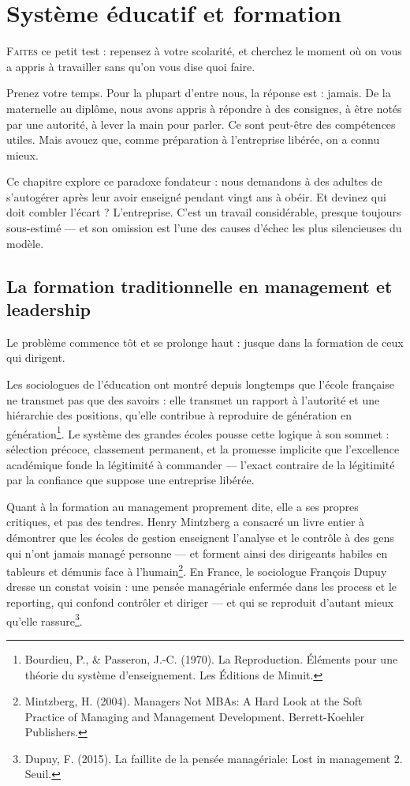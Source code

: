 
\chapter{Système éducatif et formation}

\lettrine[lines=2]{F}{aites} ce petit test : repensez à votre scolarité, et cherchez le moment où on vous a appris à travailler sans qu'on vous dise quoi faire.

Prenez votre temps. Pour la plupart d'entre nous, la réponse est : jamais. De la maternelle au diplôme, nous avons appris à répondre à des consignes, à être notés par une autorité, à lever la main pour parler. Ce sont peut-être des compétences utiles. Mais avouez que, comme préparation à l'entreprise libérée, on a connu mieux.

Ce chapitre explore ce paradoxe fondateur : nous demandons à des adultes de s'autogérer après leur avoir enseigné pendant vingt ans à obéir. Et devinez qui doit combler l'écart ? L'entreprise. C'est un travail considérable, presque toujours sous-estimé — et son omission est l'une des causes d'échec les plus silencieuses du modèle.

\section{La formation traditionnelle en management et leadership}

Le problème commence tôt et se prolonge haut : jusque dans la formation de ceux qui dirigent.

Les sociologues de l'éducation ont montré depuis longtemps que l'école française ne transmet pas que des savoirs : elle transmet un rapport à l'autorité et une hiérarchie des positions, qu'elle contribue à reproduire de génération en génération\footnote{Bourdieu, P., \& Passeron, J.-C. (1970). La Reproduction. Éléments pour une théorie du système d'enseignement. Les Éditions de Minuit.}. Le système des grandes écoles pousse cette logique à son sommet : sélection précoce, classement permanent, et la promesse implicite que l'excellence académique fonde la légitimité à commander — l'exact contraire de la légitimité par la confiance que suppose une entreprise libérée.

Quant à la formation au management proprement dite, elle a ses propres critiques, et pas des tendres. Henry Mintzberg a consacré un livre entier à démontrer que les écoles de gestion enseignent l'analyse et le contrôle à des gens qui n'ont jamais managé personne — et forment ainsi des dirigeants habiles en tableurs et démunis face à l'humain\footnote{Mintzberg, H. (2004). Managers Not MBAs: A Hard Look at the Soft Practice of Managing and Management Development. Berrett-Koehler Publishers.}. En France, le sociologue François Dupuy dresse un constat voisin : une pensée managériale enfermée dans les process et le reporting, qui confond contrôler et diriger — et qui se reproduit d'autant mieux qu'elle rassure\footnote{Dupuy, F. (2015). La faillite de la pensée managériale: Lost in management 2. Seuil.}.

